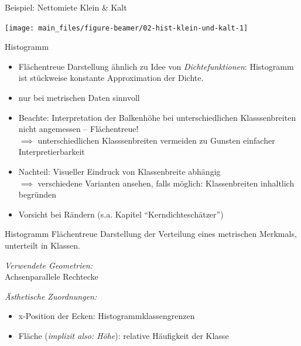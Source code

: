 \documentclass[
  10pt,
  ignorenonframetext,
]{beamer}
\providecommand{\tightlist}{%
  \setlength{\itemsep}{0pt}\setlength{\parskip}{0pt}}
\begin{document}
\begin{frame}{Beispiel: Nettomiete Klein \& Kalt}
\label{beispiel-nettomiete-klein-kalt}
\scriptsize

\begin{center}\texttt{[image: main\_files/figure-beamer/02-hist-klein-und-kalt-1]} \end{center}

\normalsize
\end{frame}

\begin{frame}{Histogramm}
\label{histogramm-1}
\begin{itemize}
\item
  Flächentreue Darstellung ähnlich zu Idee von \emph{Dichtefunktionen}:
  Histogramm ist stückweise konstante Approximation der Dichte.
\item
  nur bei metrischen Daten sinnvoll ~
\item
  Beachte: Interpretation der Balkenhöhe bei unterschiedlichen
  Klasssenbreiten nicht angemessen -- Flächentreue!\\
  \(\implies\) unterschiedlichen Klasssenbreiten vermeiden zu Gunsten
  einfacher Interpretierbarkeit ~
\item
  Nachteil: Visueller Eindruck von Klassenbreite abhängig\\
  \(\implies\) verschiedene Varianten ansehen, falls möglich:
  Klassenbreiten inhaltlich begründen
\item
  Vorsicht bei Rändern (s.a. Kapitel ``Kerndichteschätzer'')
\end{itemize}
\end{frame}

\begin{frame}{Histogramm}
\label{histogramm-2}
Flächentreue Darstellung der Verteilung eines metrischen Merkmals,
unterteilt in Klassen.

\emph{Verwendete Geometrien:}\\
Achsenparallele Rechtecke

\emph{Ästhetische Zuordnungen:}

\begin{itemize}
\tightlist
\item
  x-Position der Ecken: Histogrammklassengrenzen
\item
  Fläche (\emph{implizit also: Höhe}): relative Häufigkeit der Klasse
\end{itemize}
\end{frame}
\end{document}
